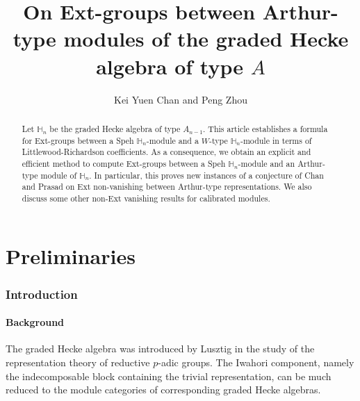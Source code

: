 \documentclass[11pt]{amsart}
\title{On Ext-groups between Arthur-type modules of the graded Hecke algebra of type $A$}
\author{Kei Yuen Chan and Peng Zhou}
\date{}
\numberwithin{equation}{section}
\theoremstyle{definition}
\begin{document}
\begin{abstract}
Let $\mathbb H_n$ be the graded Hecke algebra of type $A_{n-1}$. This article establishes a formula for Ext-groups between a Speh $\mathbb H_n$-module and a $W$-type $\mathbb H_n$-module in terms of Littlewood-Richardson coefficients. As a consequence, we obtain an explicit and efficient method to compute Ext-groups between a Speh $\mathbb H_n$-module and an Arthur-type module of $\mathbb H_n$. In particular, this proves new instances of a conjecture of Chan and Prasad on Ext non-vanishing between Arthur-type representations. We also discuss some other non-Ext vanishing results for calibrated modules.
\end{abstract}





\maketitle
\tableofcontents


\part{Preliminaries}
\section{Introduction}

\subsection{Background}
 The graded Hecke algebra was introduced by Lusztig \cite{lusztig1989affine} in the study of the representation theory of reductive $p$-adic groups. The Iwahori component, namely the indecomposable block containing the trivial representation, can be much reduced to the module categories of corresponding graded Hecke algebras.
\end{document}
